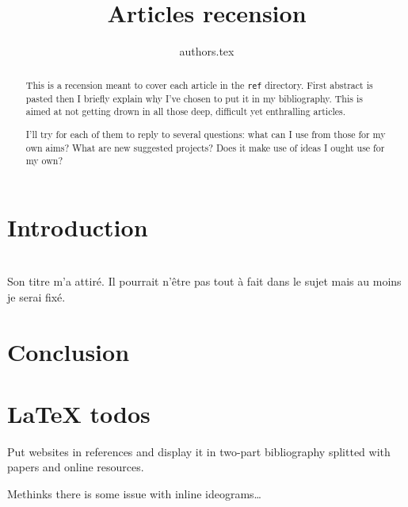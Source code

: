 \documentclass[12pt,onecolumn]{article}
\title{Articles recension}
\author{{authors.tex}}
\begin{document}
\maketitle
{}
\begin{abstract}
\par This is a recension meant to cover each article in the \texttt{ref} directory. First abstract is pasted then I briefly explain why I've chosen to put it in my bibliography. This is aimed at not getting drown in all those deep, difficult yet enthralling articles.\par I'll try for each of them to reply to several questions: what can I use from those for my own aims? What are new suggested projects? Does it make use of ideas I ought use for my own?
\end{abstract}

\tableofcontents



\section*{Introduction}

\section{}


\section{}


\section{}
Son titre m'a attiré. Il pourrait n'être pas tout à fait dans le sujet mais au moins je serai fixé.

\section*{Conclusion}
\section{\LaTeX{} todos}
Put websites in references and display it in two-part bibliography splitted with papers and online resources.

Methinks there is some issue with inline ideograms\dots{}
\end{document}
